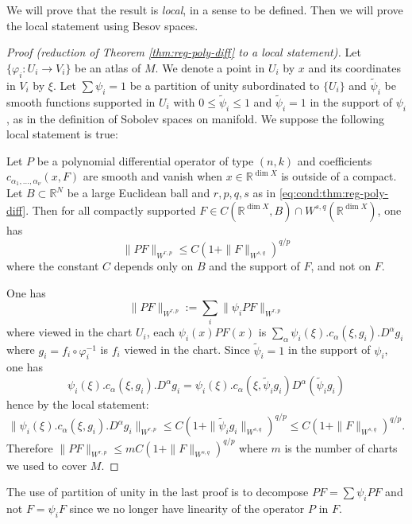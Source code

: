 We will prove that the result is \emph{local}, in a sense to be defined. Then we will prove the
local statement using Besov spaces.

\begin{proof}[Proof (reduction of Theorem \ref{thm:reg-poly-diff} to a local statement)]
Let \(\{ \varphi_i: U_i \longrightarrow V_i \}\) be an atlas of \(M\). We denote a point
in \(U_i\) by \(x\) and its coordinates in \(V_i\) by \(\xi\). Let \(\sum \psi_i
= 1\) be a partition of unity subordinated to \(\{U_i\}\) and \(\tilde \psi_i\)
be smooth functions supported in \(U_i\) with \(0\leq \tilde \psi_i \leq 1\) and \(\tilde \psi_i = 1\) in the support of
\(\psi_i\), as in the definition of Sobolev spaces on manifold. We suppose the following local statement is true:
\begin{lemma}
\label{lem:loc-reg-poly-diff}
Let \(P\) be a polynomial differential operator of type \((n,k)\) and coefficients \(c_{\alpha_1,\dots,\alpha_\nu}(x,F)\) are smooth and vanish when \(x\in \mathbb{R}^{\dim X}\) is
outside of a compact. Let \(B\subset \mathbb{R}^N\) be a large Euclidean ball and \(r,p,q,s\) as in \eqref{eq:cond:thm:reg-poly-diff}. Then for all compactly supported  \(F\in C (\mathbb{R}^{\dim X},B)
\cap W^{s,q}(\mathbb{R}^{\dim X})\), one has
\[
 \|P F \|_{W^{r,p}} \leq C\left(1 + \|F\|_{W^{s,q}}\right)^{q/p}
\]
where the constant \(C\) depends only on \(B\) and the support of \(F\), and not on \(F\).
\end{lemma}
One has
\[
\| PF \|_{W^{r,p}} := \sum_i \|\psi_i P F\|_{W^{r,p}}
\]
where viewed in the chart \(U_i\), each \(\psi_i(x) PF(x)\) is \(\sum_\alpha\psi_i(\xi). c_\alpha
(\xi,g_i). D^\alpha g_i\) where \(g_i = f_i\circ \varphi_i^{-1}\) is \(f_i\) viewed in
the chart. Since \(\tilde \psi_i = 1\) in the support of \(\psi_i\), one has
\[
 \psi_i(\xi). c_\alpha (\xi,g_i). D^\alpha g_i = \psi_i(\xi). c_\alpha(\xi,\tilde \psi_i g_i) D^\alpha
(\tilde\psi_i g_i)
\]
hence by the local statement:
\[
\| \psi_i(\xi). c_\alpha (\xi,g_i). D^\alpha g_i \|_{W^{r,p}} \leq C \left( 1 + 
\|\tilde \psi_i g_i\|_{W^{s,q}} \right)^{q/p} \leq C \left( 1 + \|F \|_{W^{s,q}}\right)^{q/p}.
\]
Therefore \(\|PF\|_{W^{r,p}} \leq m C \left( 1 + \|F \|_{W^{s,q}}\right)^{q/p}\) where
\(m\) is the number of charts we used to cover \(M\).
\end{proof}
\begin{remark}
The use of partition of unity in the last proof is to decompose \(PF = \sum \psi_i PF\)
and not \(F = \psi_i F\) since we no longer have linearity of the operator \(P\) in \(F\).
\end{remark}

